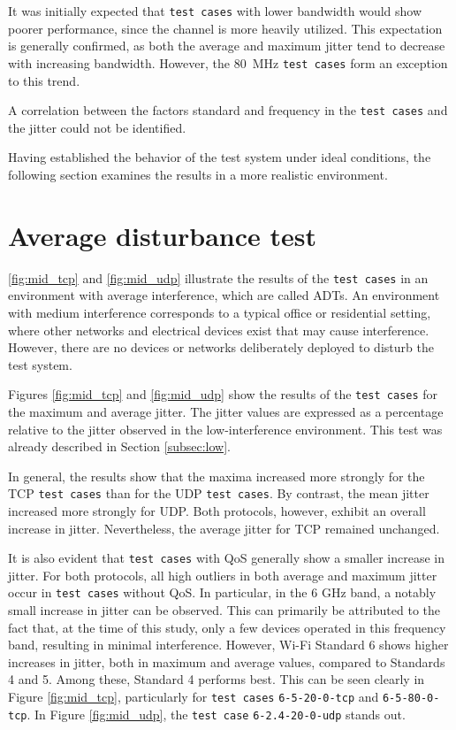 It was initially expected that \texttt{test cases} with lower bandwidth would show poorer performance, since the channel is more heavily utilized.  
This expectation is generally confirmed, as both the average and maximum jitter tend to decrease with increasing bandwidth.  
However, the 80~MHz \texttt{test cases} form an exception to this trend.  

A correlation between the factors standard and frequency in the \texttt{test cases} and the jitter could not be identified.  

Having established the behavior of the test system under ideal conditions, the following section examines the results in a more realistic environment.  

\section{Average disturbance test}  \label{subsec:medium}

\ref{fig:mid_tcp} and \ref{fig:mid_udp} illustrate the results of the \texttt{test cases} in an environment with average interference, which are called \acp{ADT}.
An environment with medium interference corresponds to a typical office or residential setting, where other networks and electrical devices exist that may cause interference.  
However, there are no devices or networks deliberately deployed to disturb the test system.  

Figures \ref{fig:mid_tcp} and \ref{fig:mid_udp} show the results of the \texttt{test cases} for the maximum and average jitter.  
The jitter values are expressed as a percentage relative to the jitter observed in the low-interference environment.  
This test was already described in Section \ref{subsec:low}.  

In general, the results show that the maxima increased more strongly for the \ac{TCP} \texttt{test cases} than for the \ac{UDP} \texttt{test cases}.  
By contrast, the mean jitter increased more strongly for \ac{UDP}.  
Both protocols, however, exhibit an overall increase in jitter.  
Nevertheless, the average jitter for \ac{TCP} remained unchanged.  

It is also evident that \texttt{test cases} with \ac{QoS} generally show a smaller increase in jitter.  
For both protocols, all high outliers in both average and maximum jitter occur in \texttt{test cases} without \ac{QoS}.  
In particular, in the 6 GHz band, a notably small increase in jitter can be observed.  
This can primarily be attributed to the fact that, at the time of this study, only a few devices operated in this frequency band, resulting in minimal interference.  
However, Wi-Fi Standard 6 shows higher increases in jitter, both in maximum and average values, compared to Standards 4 and 5.  
Among these, Standard 4 performs best.  
This can be seen clearly in Figure \ref{fig:mid_tcp}, particularly for \texttt{test cases} \texttt{6-5-20-0-tcp} and \texttt{6-5-80-0-tcp}.  
In Figure \ref{fig:mid_udp}, the \texttt{test case} \texttt{6-2.4-20-0-udp} stands out.  

